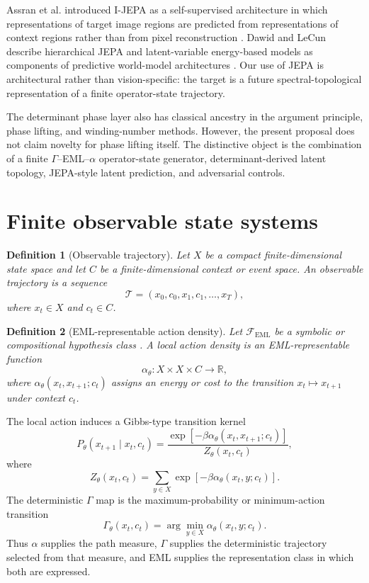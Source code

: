 \documentclass[11pt]{article}
\newtheorem{definition}{Definition}
\begin{document}
Assran et al. introduced I-JEPA as a self-supervised architecture in which representations of target image regions are predicted from representations of context regions rather than from pixel reconstruction \cite{Assran2023}. Dawid and LeCun describe hierarchical JEPA and latent-variable energy-based models as components of predictive world-model architectures \cite{DawidLeCun2023}. Our use of JEPA is architectural rather than vision-specific: the target is a future spectral-topological representation of a finite operator-state trajectory.

The determinant phase layer also has classical ancestry in the argument principle, phase lifting, and winding-number methods. However, the present proposal does not claim novelty for phase lifting itself. The distinctive object is the combination of a finite $\Gamma$--EML--$\alpha$ operator-state generator, determinant-derived latent topology, JEPA-style latent prediction, and adversarial controls.

\section{Finite observable state systems}
\begin{definition}[Observable trajectory]
Let $X$ be a compact finite-dimensional state space and let $C$ be a finite-dimensional context or event space. An observable trajectory is a sequence
\begin{equation}
\mathcal{T}=(x_0,c_0,x_1,c_1,\ldots,x_T),
\end{equation}
where $x_t\in X$ and $c_t\in C$.
\end{definition}

\begin{definition}[EML-representable action density]
Let $\mathcal{F}_{\mathrm{EML}}$ be a symbolic or compositional hypothesis class \cite{Odrzywolek2026}. A local action density is an EML-representable function
\begin{equation}
\alpha_\theta:X\times X\times C\to \mathbb{R},
\end{equation}
where $\alpha_\theta(x_t,x_{t+1};c_t)$ assigns an energy or cost to the transition $x_t\mapsto x_{t+1}$ under context $c_t$.
\end{definition}

The local action induces a Gibbs-type transition kernel
\begin{equation}
P_\theta(x_{t+1}\mid x_t,c_t)=\frac{\exp[-\beta\alpha_\theta(x_t,x_{t+1};c_t)]}{Z_\theta(x_t,c_t)},
\end{equation}
where
\begin{equation}
Z_\theta(x_t,c_t)=\sum_{y\in X}\exp[-\beta\alpha_\theta(x_t,y;c_t)].
\end{equation}
The deterministic $\Gamma$ map is the maximum-probability or minimum-action transition
\begin{equation}
\Gamma_\theta(x_t,c_t)=\arg\min_{y\in X}\alpha_\theta(x_t,y;c_t).
\end{equation}
Thus $\alpha$ supplies the path measure, $\Gamma$ supplies the deterministic trajectory selected from that measure, and EML supplies the representation class in which both are expressed.
\end{document}
